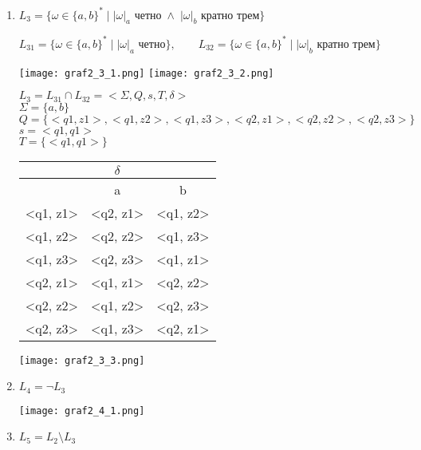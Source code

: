 \documentclass[12pt]{article}
\begin{document}
\begin{enumerate}
    \item $L_3 = \{\omega \in \{a, b\}^* \; | \; |\omega|_a$ четно$\; \land \; |\omega|_b$ кратно трем$\}$
    
    $L_{31} = \{\omega \in \{a, b\}^* \; | \; |\omega|_a$ четно$\}, \qquad L_{32} = \{\omega \in \{a, b\}^* \; | \; |\omega|_b$ кратно трем$\}$
    \begin{center}
        \texttt{[image: graf2\_3\_1.png]}
        \texttt{[image: graf2\_3\_2.png]}
    \end{center}
    \begin{flushleft}
        $L_3 = L_{31} \cap L_{32} = <\Sigma, Q, s, T, \delta>$ \\
        $\Sigma = \{a, b\}$\\
        $Q = \{<q1, z1>, <q1, z2>, <q1, z3>, <q2, z1>, <q2, z2>, <q2, z3>\}$\\
        $s = <q1, q1>$\\
        $T = \{<q1, q1>\}$\\
        \begin{tabular}{ |c|c|c| }
            \hline
            \multicolumn{3}{|c|}{$\delta$} \\
            \hline
             & a & b \\
            \hline
            <q1, z1> & <q2, z1> & <q1, z2> \\
            \hline
            <q1, z2> & <q2, z2> & <q1, z3> \\
            \hline
            <q1, z3> & <q2, z3> & <q1, z1> \\
            \hline
            <q2, z1> & <q1, z1> & <q2, z2> \\
            \hline
            <q2, z2> & <q1, z2> & <q2, z3> \\
            \hline
            <q2, z3> & <q1, z3> & <q2, z1> \\
            \hline
        \end{tabular}
        \texttt{[image: graf2\_3\_3.png]}
    \end{flushleft}

    \item $L_4 = \lnot{L_3}$
    \begin{center}
        \texttt{[image: graf2\_4\_1.png]}
    \end{center}
    \item $L_5 = L_2 \setminus L_3$
    

\end{enumerate}
\end{document}
